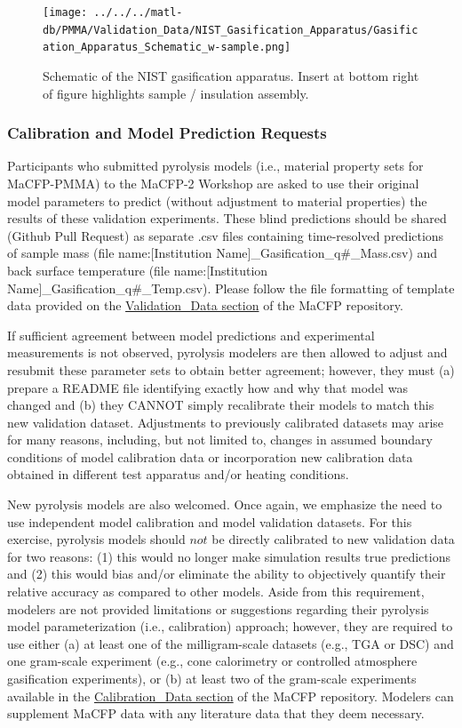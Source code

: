 \documentclass[12pt]{article}
\begin{document}
\begin{figure}
     \centering
         \texttt{[image: ../../../matl-db/PMMA/Validation\_Data/NIST\_Gasification\_Apparatus/Gasification\_Apparatus\_Schematic\_w-sample.png]}
         \caption{ Schematic of the NIST gasification apparatus. Insert at bottom right of figure highlights sample / insulation assembly.}
         \label{fig:NISTGasApp}
\end{figure}

\subsubsection*{Calibration and Model Prediction Requests }
Participants who submitted pyrolysis models (i.e., material property sets for MaCFP-PMMA) to the MaCFP-2 Workshop are asked to use their original model parameters to predict (without adjustment to material properties) the results of these validation experiments. These blind predictions should be shared (Github Pull Request) as separate .csv files containing time-resolved predictions of sample mass (file name:[Institution Name]\_Gasification\_q\#\_Mass.csv) and back surface temperature (file name:[Institution Name]\_Gasification\_q\#\_Temp.csv). Please follow the file formatting of template data provided on the \href{https://github.com/MaCFP/matl-db/tree/master/PMMA/Validation_Data/NIST_Gasification_Apparatus}{Validation\_Data section} of the MaCFP repository.

If sufficient agreement between model predictions and experimental measurements is not observed, pyrolysis modelers are then allowed to adjust and resubmit these parameter sets to obtain better agreement; however, they must (a) prepare a README file identifying exactly how and why that model was changed and (b) they CANNOT simply recalibrate their models to match this new validation dataset.  Adjustments to previously calibrated datasets may arise for many reasons, including,  but not limited to, changes in assumed boundary conditions of model calibration data or incorporation new calibration data obtained in different test apparatus and/or heating conditions.

New pyrolysis models are also welcomed. Once again, we emphasize the need to use independent model calibration and model validation datasets. For this exercise, pyrolysis models should $not$ be directly calibrated to new validation data for two reasons: (1) this would no longer make simulation results true predictions and (2) this would bias and/or eliminate the ability to objectively quantify their relative accuracy as compared to other models. Aside from this requirement, modelers are not provided limitations or suggestions regarding their pyrolysis model parameterization (i.e., calibration) approach; however, they are required to use either (a) at least one of the milligram-scale datasets (e.g., TGA or DSC) and one gram-scale experiment (e.g., cone calorimetry or controlled atmosphere gasification experiments), or (b) at least two of the gram-scale experiments available in the \href{https://github.com/MaCFP/matl-db/tree/master/PMMA/Calibration_Data}{Calibration\_Data section} of the MaCFP repository. Modelers can supplement MaCFP data with any literature data that they deem necessary.
\end{document}
